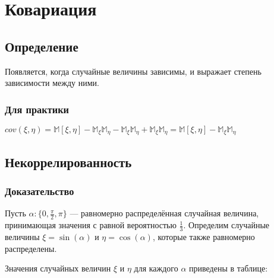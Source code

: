 \documentclass[../Main.tex]{subfiles}
\begin{document}
\chapter{Ковариация}

\section{Определение}
Появляется, когда случайные величины зависимы, и выражает степень зависимости между ними.


\subsection{Для практики}
\(
cov(\xi, \eta) = \mathbb{M}[\xi, \eta] - \mathbb{M}_\xi \mathbb{M}_\eta - \mathbb{M}_\xi \mathbb{M}_\eta + \mathbb{M}_\xi \mathbb{M}_\eta = \mathbb{M}[\xi, \eta] - \mathbb{M}_\xi \mathbb{M}_\eta
\)

\section{Некоррелированность}




\subsection{Доказательство}

Пусть \(\alpha: \{0, \frac{\pi}{2}, \pi\}\) --- равномерно распределённая случайная величина, принимающая значения с равной вероятностью \(\frac{1}{3}\). Определим случайные величины \(\xi = \sin(\alpha)\) и \(\eta = \cos(\alpha)\), которые также равномерно распределены.

Значения случайных величин \(\xi\) и \(\eta\) для каждого \(\alpha\) приведены в таблице:
\end{document}
